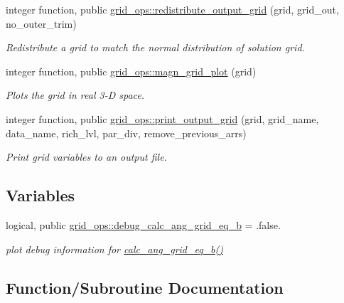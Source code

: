 \begin{DoxyCompactItemize}
integer function, public \hyperlink{namespacegrid__ops_ab10ef5b486ee3861df2da4e53bc22630}{grid\+\_\+ops\+::redistribute\+\_\+output\+\_\+grid} (grid, grid\+\_\+out, no\+\_\+outer\+\_\+trim)
\begin{DoxyCompactList}\small\item\em Redistribute a grid to match the normal distribution of solution grid. \end{DoxyCompactList}\item 
integer function, public \hyperlink{namespacegrid__ops_addd76b7b3be0b51e0863ae0cdfef41e6}{grid\+\_\+ops\+::magn\+\_\+grid\+\_\+plot} (grid)
\begin{DoxyCompactList}\small\item\em Plots the grid in real 3-\/D space. \end{DoxyCompactList}\item 
integer function, public \hyperlink{namespacegrid__ops_a4827e794d37334c0cad9bb2016e64d46}{grid\+\_\+ops\+::print\+\_\+output\+\_\+grid} (grid, grid\+\_\+name, data\+\_\+name, rich\+\_\+lvl, par\+\_\+div, remove\+\_\+previous\+\_\+arrs)
\begin{DoxyCompactList}\small\item\em Print grid variables to an output file. \end{DoxyCompactList}\end{DoxyCompactItemize}
\subsection*{Variables}
\begin{DoxyCompactItemize}
\item 
logical, public \hyperlink{namespacegrid__ops_ad043ab1b07b2d251bb7596b8c8d2f960}{grid\+\_\+ops\+::debug\+\_\+calc\+\_\+ang\+\_\+grid\+\_\+eq\+\_\+b} = .false.
\begin{DoxyCompactList}\small\item\em plot debug information for \hyperlink{namespacegrid__ops_a06107dbdfd1dd62e372cc29ab0255bad}{calc\+\_\+ang\+\_\+grid\+\_\+eq\+\_\+b()} \end{DoxyCompactList}\end{DoxyCompactItemize}


\subsection{Function/\+Subroutine Documentation}
\mbox{\label{grid__ops_8f90_a868669b6df6c0fa6a8cedd993042f6ea}} 
